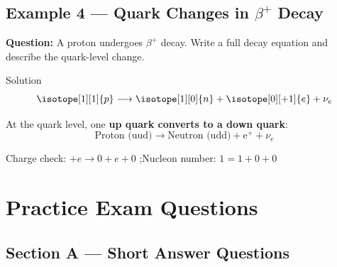 \pagebreak

\subsection*{Example 4 — Quark Changes in $\beta^+$ Decay}

\textbf{Question:} A proton undergoes $\beta^+$ decay. Write a full decay equation and describe the quark-level change.

\begin{examplebox}{Solution}
$$\isotope[1][1]{p} \longrightarrow \isotope[1][0]{n} + \isotope[0][+1]{e} + \nu_e$$

At the quark level, one \textbf{up quark converts to a down quark}:
$$\text{Proton (uud)} \longrightarrow \text{Neutron (udd)} + \mathrm{e}^+ + \nu_e$$

Charge check: $+e \to 0 + e + 0$ \checkmark;\quad Nucleon number: $1 = 1 + 0 + 0$ \checkmark
\end{examplebox}

\section{Practice Exam Questions}

\subsection*{Section A — Short Answer Questions}

